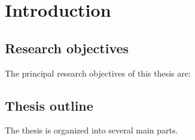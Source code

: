 \chapter{Introduction}
\Blindtext

\section{Research objectives}
The principal research objectives of this thesis are:
\blindenumerate[3]

\section{Thesis outline}
The thesis is organized into several main parts.
\blinditemize[3]
